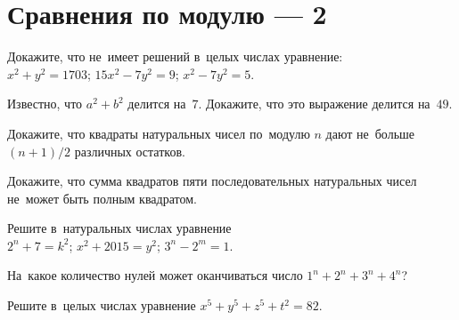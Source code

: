 
\section*{Сравнения по модулю --- 2}


\begin{problems}

\item
Докажите, что не~имеет решений в~целых числах уравнение:
\\
\sp $x^2 + y^2 = 1703$;
\qquad
\sp $15x^2 - 7y^2 = 9$;
\qquad
\sp $x^2 - 7y^2 = 5$.

\item
Известно, что $a^2 + b^2$ делится на~$7$.
Докажите, что это выражение делится на~$49$.

\item
Докажите, что квадраты натуральных чисел по~модулю $n$ дают не~больше
$(n + 1) / 2$ различных остатков.

\item
Докажите, что сумма квадратов пяти последовательных натуральных чисел не~может
быть полным квадратом.

\item
Решите в~натуральных числах уравнение 
\\
\sp $2^n + 7 = k^2$;
\qquad
\sp $x^2 + 2015 = y^2$;
\qquad
\sp $3^n - 2^m = 1$.

\item
На~какое количество нулей может оканчиваться число $1^n + 2^n + 3^n + 4^n$?

\item
Решите в~целых числах уравнение $x^5 + y^5 + z^5 + t^2 = 82$.

\end{problems}

